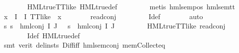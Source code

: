 \begin{isabellebody}
\ \ \ \ \ \ \isamarkupfalse%
\ HML{\isacharunderscore}{\kern0pt}true{\isacharunderscore}{\kern0pt}TT{\isacharunderscore}{\kern0pt}like\ HML{\isacharunderscore}{\kern0pt}true{\isacharunderscore}{\kern0pt}def\ \isanewline
\ \ \ \ \ \ \isamarkupfalse%
\ {\isacharparenleft}{\kern0pt}metis\ hml{\isacharunderscore}{\kern0pt}sem{\isacharunderscore}{\kern0pt}pos\ hml{\isacharunderscore}{\kern0pt}sem{\isacharunderscore}{\kern0pt}tt{\isacharparenright}{\kern0pt}\isanewline
\ \ \ \ \isamarkupfalse%
\ {\isachardoublequoteopen}{\isasymforall}x\ {\isasymin}\ {\isacharparenleft}{\kern0pt}I\ {\isacharminus}{\kern0pt}\ I{\isacharprime}{\kern0pt}{\isacharparenright}{\kern0pt}{\isachardot}{\kern0pt}\ TT{\isacharunderscore}{\kern0pt}like\ {\isacharparenleft}{\kern0pt}{\isasymPhi}\ x{\isacharparenright}{\kern0pt}{\isachardoublequoteclose}\isanewline
\ \ \ \ \ \ \isamarkupfalse%
\ read{\isacharunderscore}{\kern0pt}conj\ {}\isanewline
\ \ \ \ \ \ \isamarkupfalse%
\ I{\isacharprime}{\kern0pt}{\isacharunderscore}{\kern0pt}def\isanewline
\ \ \ \ \ \ \isamarkupfalse%
\ auto\isanewline
\ \ \ \ \isamarkupfalse%
\ {\isachardoublequoteopen}{\isacharparenleft}{\kern0pt}{\isasymforall}s{\isachardot}{\kern0pt}\ {\isacharparenleft}{\kern0pt}s\ {\isasymTurnstile}\ hml{\isacharunderscore}{\kern0pt}conj\ I\ J\ {\isasymPhi}{\isacharparenright}{\kern0pt}\ {\isacharequal}{\kern0pt}\ {\isacharparenleft}{\kern0pt}s\ {\isasymTurnstile}\ {\isacharparenleft}{\kern0pt}hml{\isacharunderscore}{\kern0pt}conj\ I{\isacharprime}{\kern0pt}\ J\ {\isasymPhi}{\isacharparenright}{\kern0pt}{\isacharparenright}{\kern0pt}{\isacharparenright}{\kern0pt}{\isachardoublequoteclose}\isanewline
\ \ \ \ \ \ \isamarkupfalse%
\ HML{\isacharunderscore}{\kern0pt}true{\isacharunderscore}{\kern0pt}TT{\isacharunderscore}{\kern0pt}like\ read{\isacharunderscore}{\kern0pt}conj\ {}\isanewline
\ \ \ \ \ \ \isamarkupfalse%
\ I{\isacharprime}{\kern0pt}{\isacharunderscore}{\kern0pt}def\ HML{\isacharunderscore}{\kern0pt}true{\isacharunderscore}{\kern0pt}def\ \isanewline
\ \ \ \ \ \ \isamarkupfalse%
\ {\isacharparenleft}{\kern0pt}smt\ {\isacharparenleft}{\kern0pt}verit{\isacharcomma}{\kern0pt}\ del{\isacharunderscore}{\kern0pt}insts{\isacharparenright}{\kern0pt}\ Diff{\isacharunderscore}{\kern0pt}iff\ hml{\isacharunderscore}{\kern0pt}sem{\isacharunderscore}{\kern0pt}conj\ mem{\isacharunderscore}{\kern0pt}Collect{\isacharunderscore}{\kern0pt}eq{\isacharparenright}{\kern0pt}\isanewline

\end{isabellebody}
